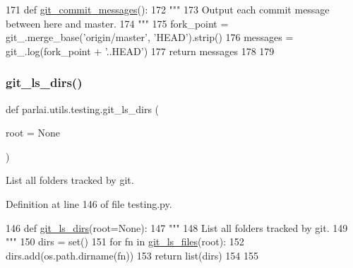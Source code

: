\begin{DoxyCode}
171 \textcolor{keyword}{def }\hyperlink{namespaceparlai_1_1utils_1_1testing_aa9971204bea89f174596698b2e736214}{git\_commit\_messages}():
172     \textcolor{stringliteral}{"""}
173 \textcolor{stringliteral}{    Output each commit message between here and master.}
174 \textcolor{stringliteral}{    """}
175     fork\_point = git\_.merge\_base(\textcolor{stringliteral}{'origin/master'}, \textcolor{stringliteral}{'HEAD'}).strip()
176     messages = git\_.log(fork\_point + \textcolor{stringliteral}{'..HEAD'})
177     \textcolor{keywordflow}{return} messages
178 
179 
\end{DoxyCode}
\mbox{\label{namespaceparlai_1_1utils_1_1testing_a767a8ac6ea27697e6f782d7375d94933}} 
\subsubsection{\texorpdfstring{git\+\_\+ls\+\_\+dirs()}{git\_ls\_dirs()}}
{\footnotesize\ttfamily def parlai.\+utils.\+testing.\+git\+\_\+ls\+\_\+dirs (\begin{DoxyParamCaption}\item[{}]{root = {\ttfamily None} }\end{DoxyParamCaption})}

\begin{DoxyVerb}List all folders tracked by git.
\end{DoxyVerb}
 

Definition at line 146 of file testing.\+py.


\begin{DoxyCode}
146 \textcolor{keyword}{def }\hyperlink{namespaceparlai_1_1utils_1_1testing_a767a8ac6ea27697e6f782d7375d94933}{git\_ls\_dirs}(root=None):
147     \textcolor{stringliteral}{"""}
148 \textcolor{stringliteral}{    List all folders tracked by git.}
149 \textcolor{stringliteral}{    """}
150     dirs = set()
151     \textcolor{keywordflow}{for} fn \textcolor{keywordflow}{in} \hyperlink{namespaceparlai_1_1utils_1_1testing_a50b91b6f209eeedd93ae7ec0e790b121}{git\_ls\_files}(root):
152         dirs.add(os.path.dirname(fn))
153     \textcolor{keywordflow}{return} list(dirs)
154 
155 
\end{DoxyCode}
\mbox{\label{namespaceparlai_1_1utils_1_1testing_a50b91b6f209eeedd93ae7ec0e790b121}} 
